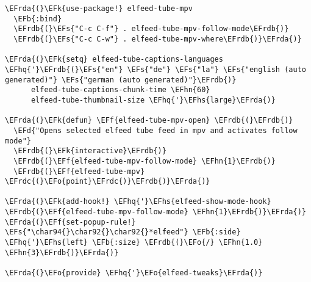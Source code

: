 \documentclass[a4wide,10pt]{article}
\newcommand{\EFs}[1]{\textcolor{EFs}{#1}} %
\newcommand{\EFd}[1]{\textcolor{EFd}{#1}} %
\newcommand{\EFk}[1]{\textcolor{EFk}{#1}} %
\newcommand{\EFb}[1]{\textcolor{EFb}{#1}} %
\newcommand{\EFf}[1]{\textcolor{EFf}{#1}} %
\newcommand{\EFo}[1]{\textcolor{EFo}{#1}} %
\newcommand{\EFhn}[1]{\textcolor{EFhn}{\textbf{#1}}} %
\newcommand{\EFhq}[1]{\textcolor{EFhq}{#1}} %
\newcommand{\EFhs}[1]{\textcolor{EFhs}{#1}} %
\newcommand{\EFrda}[1]{\textcolor{EFrda}{#1}} %
\newcommand{\EFrdb}[1]{\textcolor{EFrdb}{#1}} %
\newcommand{\EFrdc}[1]{\textcolor{EFrdc}{#1}} %
\begin{document}
\begin{Code}
\begin{Verbatim}
\EFrda{(}\EFk{use-package!} elfeed-tube-mpv
  \EFb{:bind}
  \EFrdb{(}\EFs{"C-c C-f"} . elfeed-tube-mpv-follow-mode\EFrdb{)}
  \EFrdb{(}\EFs{"C-c C-w"} . elfeed-tube-mpv-where\EFrdb{)}\EFrda{)}

\EFrda{(}\EFk{setq} elfeed-tube-captions-languages \EFhq{'}\EFrdb{(}\EFs{"en"} \EFs{"de"} \EFs{"la"} \EFs{"english (auto generated)"} \EFs{"german (auto generated)"}\EFrdb{)}
      elfeed-tube-captions-chunk-time \EFhn{60}
      elfeed-tube-thumbnail-size \EFhq{'}\EFhs{large}\EFrda{)}

\EFrda{(}\EFk{defun} \EFf{elfeed-tube-mpv-open} \EFrdb{(}\EFrdb{)}
  \EFd{"Opens selected elfeed tube feed in mpv and activates follow mode"}
  \EFrdb{(}\EFk{interactive}\EFrdb{)}
  \EFrdb{(}\EFf{elfeed-tube-mpv-follow-mode} \EFhn{1}\EFrdb{)}
  \EFrdb{(}\EFf{elfeed-tube-mpv} \EFrdc{(}\EFo{point}\EFrdc{)}\EFrdb{)}\EFrda{)}

\EFrda{(}\EFk{add-hook!} \EFhq{'}\EFhs{elfeed-show-mode-hook} \EFrdb{(}\EFf{elfeed-tube-mpv-follow-mode} \EFhn{1}\EFrdb{)}\EFrda{)}
\EFrda{(}\EFf{set-popup-rule!} \EFs{"\char94{}\char92{}\char92{}*elfeed"} \EFb{:side} \EFhq{'}\EFhs{left} \EFb{:size} \EFrdb{(}\EFo{/} \EFhn{1.0} \EFhn{3}\EFrdb{)}\EFrda{)}

\EFrda{(}\EFo{provide} \EFhq{'}\EFo{elfeed-tweaks}\EFrda{)}
\end{Verbatim}
\end{Code}
\end{document}
